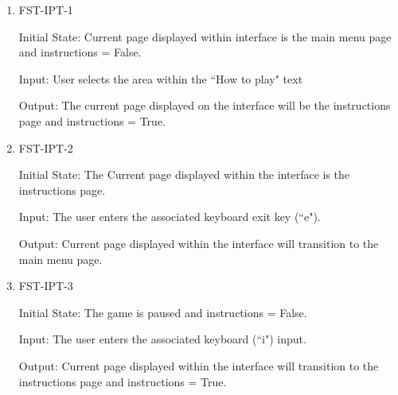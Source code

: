 \documentclass[12pt, titlepage]{article}
\begin{document}
\begin{enumerate}

\item{FST-IPT-1\\}
					
Initial State: Current page displayed within interface is the main menu page and instructions = False.
					
Input: User selects the area within the ``How to play" text
					
Output: The current page displayed on the interface will be the instructions page and instructions = True.
					
\item{FST-IPT-2\\}
					
Initial State: The Current page displayed within the interface is the instructions page.
					
Input: The user enters the associated keyboard exit key (``e").
					
Output: Current page displayed within the interface will transition to the main menu page.
					

\item{FST-IPT-3\\}
					
Initial State:  The game is paused and instructions = False.
					
Input: The user enters the associated keyboard (``i") input.
					
Output: Current page displayed within the interface will transition to the instructions page and instructions = True.



\end{enumerate}




					
					
					
\end{document}
